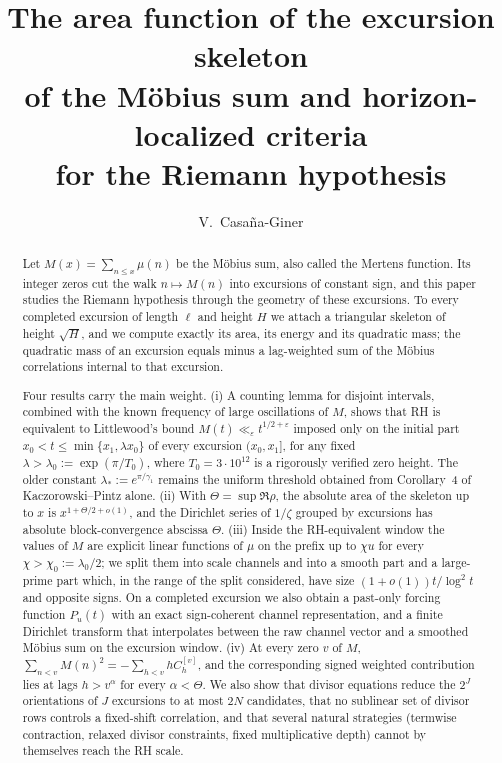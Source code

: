 \documentclass[11pt,reqno]{amsart}
\title[The excursion skeleton of the Möbius sum]{The area function of the excursion skeleton\\ of the Möbius sum and
horizon-localized criteria\\ for the Riemann hypothesis}
\author{V.~Casa\~na-Giner}
\date{}
\numberwithin{equation}{section}
\theoremstyle{plain}
\theoremstyle{definition}
\theoremstyle{remark}
\newcommand{\eps}{\varepsilon}
\begin{document}
\begin{abstract}
Let $M(x)=\sum_{n\le x}\mu(n)$ be the Möbius sum, also called the Mertens
function. Its integer zeros cut the walk $n\mapsto M(n)$ into excursions of
constant sign, and this paper studies the Riemann hypothesis through the
geometry of these excursions. To every completed excursion of length $\ell$
and height $H$ we attach a triangular skeleton of height $\sqrt H$, and we
compute exactly its area, its energy and its quadratic mass; the quadratic
mass of an excursion equals minus a lag-weighted sum of the Möbius
correlations internal to that excursion.

Four results carry the main weight. (i) A counting lemma for disjoint
intervals, combined with the known frequency of large oscillations of $M$,
shows that RH is equivalent to Littlewood's bound
$M(t)\ll_\eps t^{1/2+\eps}$ imposed only on the initial part
$x_0<t\le\min\{x_1,\lambda x_0\}$ of every excursion $(x_0,x_1]$, for any
fixed $\lambda>\lambda_0:=\exp(\pi/T_0)$, where $T_0=3\cdot10^{12}$ is a rigorously verified zero height. The older constant $\lambda_*:=e^{\pi/\gamma_1}$ remains the uniform threshold obtained from Corollary~4 of Kaczorowski--Pintz alone. (ii) With $\Theta=\sup\Re\rho$, the absolute area of the skeleton up
to $x$ is $x^{1+\Theta/2+o(1)}$, and the Dirichlet series of $1/\zeta$
grouped by excursions has absolute block-convergence abscissa $\Theta$. (iii) Inside the RH-equivalent window the values of
$M$ are explicit linear functions of $\mu$ on the prefix up to $\chi u$ for
every $\chi>\chi_0:=\lambda_0/2$; we split them into scale channels and
into a smooth part and a large-prime part which, in the range of the split
considered, have size $(1+o(1))t/\log^2t$ and opposite signs.  On a completed
excursion we also obtain a past-only forcing function $P_u(t)$ with an exact
sign-coherent channel representation, and a finite Dirichlet transform that
interpolates between the raw channel vector and a smoothed M\"obius sum on
the excursion window.
(iv) At every zero $v$ of $M$,
$\sum_{n<v}M(n)^2=-\sum_{h<v}hC_h^{[v]}$, and the corresponding signed weighted contribution lies at
lags $h>v^\alpha$ for every $\alpha<\Theta$. We also show that divisor
equations reduce the $2^J$ orientations of $J$ excursions to at most $2N$
candidates, that no sublinear set of divisor rows controls a fixed-shift
correlation, and that several natural strategies (termwise contraction,
relaxed divisor constraints, fixed multiplicative depth) cannot by
themselves reach the RH scale.
\end{abstract}
\end{document}
